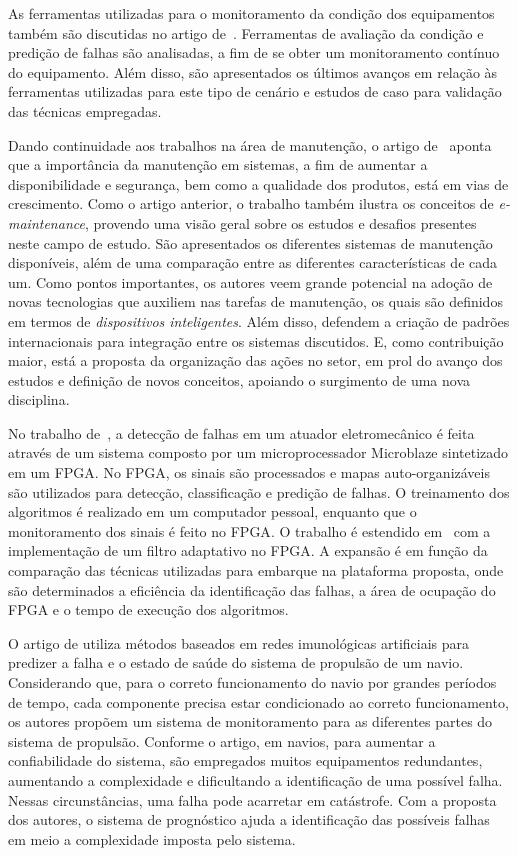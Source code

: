 As ferramentas utilizadas para o monitoramento da condição dos equipamentos também são discutidas no
artigo de~\cite{lee2006intelligent}. Ferramentas de avaliação da condição e predição de falhas são
analisadas, a fim de se obter um monitoramento contínuo do equipamento. Além disso, são apresentados
os últimos avanços em relação às ferramentas utilizadas para este tipo de cenário e estudos de caso
para validação das técnicas empregadas.

Dando continuidade aos trabalhos na área de manutenção, o artigo de~\cite{muller2008concept} aponta
que a importância da manutenção em sistemas, a fim de aumentar a disponibilidade e segurança, bem
como a qualidade dos produtos, está em vias de crescimento. Como o artigo anterior, o trabalho
também ilustra os conceitos de \textit{e-maintenance}, provendo uma visão geral sobre os estudos e
desafios presentes neste campo de estudo. São apresentados os diferentes sistemas de manutenção
disponíveis, além de uma comparação entre as diferentes características de cada um. Como pontos
importantes, os autores veem grande potencial na adoção de novas tecnologias que auxiliem nas
tarefas de manutenção, os quais são definidos em termos de \emph{dispositivos inteligentes}. Além
disso, defendem a criação de padrões internacionais para integração entre os sistemas discutidos. E,
como contribuição maior, está a proposta da organização das ações no setor, em prol do avanço dos
estudos e definição de novos conceitos, apoiando o surgimento de uma nova disciplina.

No trabalho de~\cite{goncalves2009design}, a detecção de falhas em um atuador eletromecânico é feita
através de um sistema composto por um microprocessador Microblaze sintetizado em um \gls{FPGA}. No
\gls{FPGA}, os sinais são processados e mapas auto-organizáveis são utilizados para detecção,
classificação e predição de falhas. O treinamento dos algoritmos é realizado em um computador
pessoal, enquanto que o monitoramento dos sinais é feito no \gls{FPGA}. O trabalho é estendido
em~\cite{goncalves2011desenvolvimento} com a implementação de um filtro adaptativo no \gls{FPGA}. A
expansão é em função da comparação das técnicas utilizadas para embarque na plataforma proposta,
onde são determinados a eficiência da identificação das falhas, a área de ocupação do \gls{FPGA} e o
tempo de execução dos algoritmos.

O artigo de \cite{hu2012prognostic} utiliza métodos baseados em redes imunológicas artificiais para
predizer a falha e o estado de saúde do sistema de propulsão de um navio. Considerando que, para o
correto funcionamento do navio por grandes períodos de tempo, cada componente precisa estar
condicionado ao correto funcionamento, os autores propõem um sistema de monitoramento para as
diferentes partes do sistema de propulsão. Conforme o artigo, em navios, para aumentar a
confiabilidade do sistema, são empregados muitos equipamentos redundantes, aumentando a complexidade
e dificultando a identificação de uma possível falha. Nessas circunstâncias, uma falha pode
acarretar em catástrofe. Com a proposta dos autores, o sistema de prognóstico ajuda a identificação
das possíveis falhas em meio a complexidade imposta pelo sistema.

